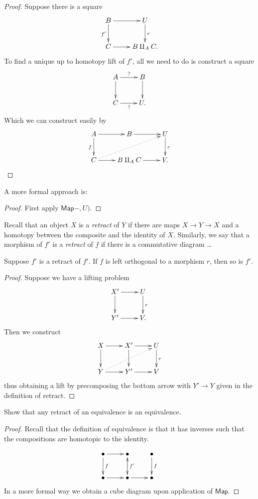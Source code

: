 \begin{proof}
Suppose there is a square
$$
\xymatrix{
B\ar[r]\ar[d]_{f'}&U\ar[d]^{r}\\
C\ar[r]&B \amalg_A C.
}
$$
To find a unique up to homotopy lift of $f'$, 
all we need to do is construct a square
$$
\xymatrix{
A\ar[r]^?\ar[d]&B\ar[d]\\
C\ar[r]_?&U.
}
$$
Which we can construct easily by
$$
\xymatrix{
A \ar[d]_f\ar[r]& B\ar[r]& U\ar[d]^r\\
C\ar@{.>}[urr]\ar[r]&  B \amalg_A C \ar[r]&V.
}
$$
\end{proof}

A more formal approach is:

\begin{proof}
First apply $\mathsf{Map}-,U)$.
\end{proof}

\begin{definition}
\label{definition-retract}
Recall that an object $X$ is a {\it retract} of $Y$ 
if there are maps $X \to Y \to X$ and 
a homotopy between the composite and the identity of $X$.
Similarly,
we say that a morphism of $f'$ is
a {\it retract} of $f$ if there is a commutative diagram
…
\end{definition}

\begin{lemma}
\label{lemma-retract-orthogonality}
Suppose $f'$ is a retract of $f'$.
If $f$ is left orthogonal to a morphism
$r$, then so is $f'$.
\end{lemma}

\begin{proof}
Suppose we have a lifting problem
$$
\xymatrix{
X'\ar[r]\ar[d]&U\ar[d]^r\\
Y'\ar[r]&V.
}
$$
Then we construct
$$
\xymatrix{
X\ar[r]\ar[d]&X'\ar[r]\ar[d]&U\ar[d]^{r}\\
Y\ar[r]\ar@{.>}[urr]&Y'\ar[r]&V
}
$$
thus obtaining a lift by precomposing the 
bottom arrow with $Y' \to Y$
given in the definition of retract.
\end{proof}

\begin{exercise}
\label{exercise-retract-of-equivalence-is-equivalence}
Show that any retract of an equivalence is an equivalence.
\end{exercise}

\begin{proof}
Recall that the definition of
equivalence is that it has inverses such
that the compositions are homotopic to the identity.

$$
\xymatrix{
\bullet\ar[r]\ar[d]^f&\bullet\ar[d]^{f'}&\bullet\ar[d]^{f}\\
\bullet\ar[r]&\bullet\ar@{.>}[u]\ar[r]&\bullet
}
$$
In a more formal way we obtain a cube diagram
upon application of $\mathsf{Map}$.
\end{proof}

